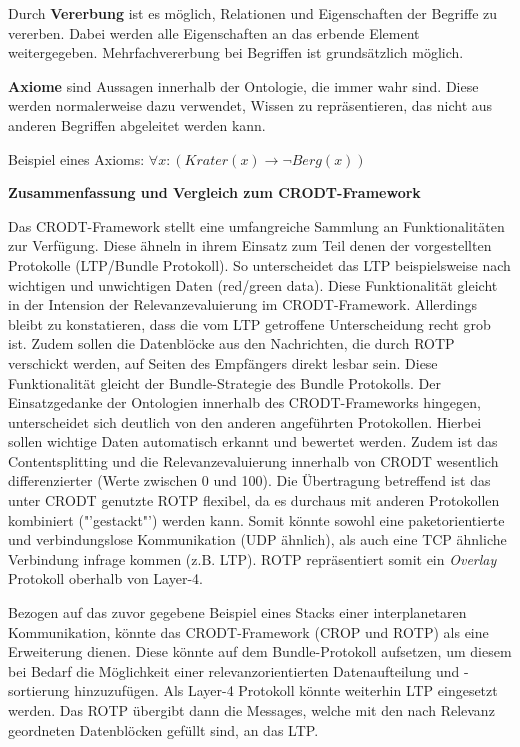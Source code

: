 Durch \textbf{Vererbung} ist es m{\"o}glich, Relationen und Eigenschaften der
 Begriffe zu vererben. Dabei werden alle Eigenschaften an das erbende Element
 weitergegeben. Mehrfachvererbung bei Begriffen ist grunds{\"a}tzlich
 m{\"o}glich.
 
 \textbf{Axiome} sind Aussagen innerhalb der Ontologie, die immer wahr sind.
 Diese werden normalerweise dazu verwendet, Wissen zu repr{\"a}sentieren, das
 nicht aus anderen Begriffen abgeleitet werden kann.
 
 Beispiel eines Axioms:\newline
 $\forall x : (Krater(x) \rightarrow \neg Berg(x))$   
      
\textbf{Zusammenfassung und Vergleich zum CRODT-Framework}

Das \gls{CRODT}-Framework stellt eine umfangreiche Sammlung an Funktionalit{\"a}ten
zur Verf{\"u}gung. Diese {\"a}hneln in ihrem Einsatz zum Teil denen der
vorgestellten Protokolle (\gls{LTP}/Bundle Protokoll). So unterscheidet das \gls{LTP}
beispielsweise nach wichtigen und unwichtigen Daten (red/green data). Diese
Funktionalit{\"a}t gleicht in der Intension der Relevanzevaluierung im
\gls{CRODT}-Framework. Allerdings bleibt zu konstatieren, dass die vom \gls{LTP} getroffene
Unterscheidung recht grob ist. Zudem sollen die
Datenbl{\"o}cke aus den Nachrichten, die durch \gls{ROTP} verschickt werden, auf
Seiten des Empf{\"a}ngers direkt lesbar sein. Diese Funktionalit{\"a}t gleicht der
Bundle-Strategie des Bundle Protokolls. Der Einsatzgedanke der Ontologien
innerhalb des \gls{CRODT}-Frameworks hingegen, unterscheidet sich deutlich von den
anderen angef{\"u}hrten Protokollen. Hierbei sollen wichtige Daten automatisch
erkannt und bewertet werden. Zudem ist das Contentsplitting und die
Relevanzevaluierung innerhalb von \gls{CRODT} wesentlich differenzierter (Werte
zwischen 0 und 100). Die {\"U}bertragung betreffend ist das unter \gls{CRODT}
genutzte \gls{ROTP} flexibel, da es durchaus mit anderen Protokollen kombiniert
("'gestackt"') werden kann. Somit k{\"o}nnte sowohl eine paketorientierte und
verbindungslose Kommunikation (\gls{UDP} {\"a}hnlich), als auch eine \gls{TCP}
{\"a}hnliche Verbindung infrage kommen (z.B. \gls{LTP}). \gls{ROTP} repr{\"a}sentiert somit ein
\textit{Overlay} Protokoll oberhalb von Layer-4. 

Bezogen auf das zuvor gegebene Beispiel eines Stacks einer interplanetaren
Kommunikation, k{\"o}nnte das \gls{CRODT}-Framework (\gls{CROP} und \gls{ROTP}) als eine
Erweiterung dienen. Diese k{\"o}nnte auf dem Bundle-Protokoll aufsetzen, um
diesem bei Bedarf die M{\"o}glichkeit einer relevanzorientierten
Datenaufteilung und -sortierung hinzuzuf{\"u}gen. Als Layer-4 Protokoll
k{\"o}nnte weiterhin \gls{LTP} eingesetzt werden. Das \gls{ROTP} {\"u}bergibt dann die
Messages, welche mit den nach Relevanz geordneten Datenbl{\"o}cken gef{\"u}llt
sind, an das \gls{LTP}.

